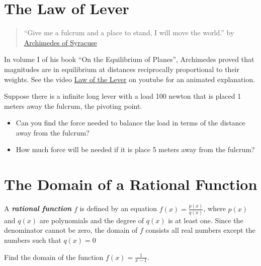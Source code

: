 \documentclass[
  en,11pt]{elegantbook}
\newcommand{\size}[2]{{\fontsize{#1}{0}\selectfont#2}}
\newenvironment{rmdthink}{
	\vspace*{0.5\baselineskip}
	\par\noindent
	\makebox[-4pt][r]{\color{green!90}\size{12}{\faLightbulbO}\,\,}
    \begin{tcolorbox}[
    enhanced,
    title={\textbf{\color{second}Think}},
    title style={left color=blue!10!green!20!white,right color=yellow!20!blue!20!white},
    colback=green!20!white,
    ]
    \sffamily
}{
    \end{tcolorbox}
	\par\ignorespacesafterend
}
\let\BeginKnitrBlock\begin \let\EndKnitrBlock\end
\begin{document}
\hypertarget{the-law-of-lever}{%
\section{The Law of Lever}\label{the-law-of-lever}}

\begin{rmdthink}

\begin{quote}
``Give me a fulcrum and a place to stand, I will move the world.'' by \href{https://en.wikipedia.org/wiki/Archimedes\#Mathematics}{Archimedes of Syracuse}
\end{quote}

In volume I of his book ``On the Equilibrium of Planes'', Archimedes proved that magnitudes are in equilibrium at distances reciprocally proportional to their weights. See the video \href{https://youtu.be/yhrR4384SGE?t=8}{Law of the Lever} on youtube for an animated explanation.

Suppose there is a infinite long lever with a load 100 newton that is placed 1 meters away the fulcrum, the pivoting point.

\begin{itemize}

\item
  Can you find the force needed to balance the load in terms of the distance away from the fulcrum?
\item
  How much force will be needed if it is place 5 meters away from the fulcrum?
\end{itemize}

\end{rmdthink}

\hypertarget{the-domain-of-a-rational-function}{%
\section{The Domain of a Rational Function}\label{the-domain-of-a-rational-function}}

A \textbf{\emph{rational function}} \(f\) is defined by an equation \(f(x)=\frac{p(x)}{q(x)}\), where \(p(x)\) and \(q(x)\) are polynomials and the degree of \(q(x)\) is at least one. Since the denominator cannot be zero, the domain of \(f\) consists all real numbers except the numbers such that \(q(x)=0\)

\BeginKnitrBlock{example}
\protect\hypertarget{exm:unnamed-chunk-274}{}{\label{exm:unnamed-chunk-274} }
Find the domain of the function \(f(x)=\frac{1}{x-1}\).
\EndKnitrBlock{example}
\end{document}
